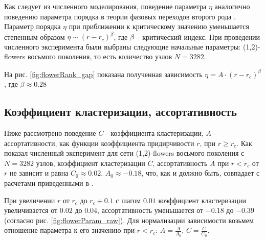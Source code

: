 \documentclass[10pt,aps,pra]{revtex4-1}
\begin{document}
        Как следует из численного моделирования, поведение параметра $\eta$ аналогично поведению параметра порядка в теории фазовых переходов второго рода \cite{Landau}. Параметр порядка $\eta$ при приближении к критическому значению уменьшается степенным образом $\eta \sim (r-r_c)^\beta$, где $\beta$ – критический индекс. 
        При проведении численного эксперимента были выбраны следующие начальные параметры: (1,2)-flowers восьмого поколения, то есть количество узлов $N=3282$.

        На рис. \ref{fig:flowerRank_gap} показана полученная зависимость $\eta = A \cdot {(r-r_c)}^\beta$, где $\beta \approx 0.28$

    \subsection{Коэффициент кластеризации, ассортативность}

        Ниже рассмотрено поведение $C$ - коэффициента кластеризации, $A$ - ассортативности, как функции коэффициента придирчивости $r$, при $r \geq r_c$. Как показал численный эксперимент для сети (1,2)-flowers восьмого поколения с $N=3282$ узлов, коэффициент кластеризации $C$, ассортативность $A$ при $r<r_c$ от $r$ не зависит и равна $C_0 \approx 0.02$, $A_0 \approx -0.18$, что, как и должно быть, совпадает с расчетами приведенными в \cite{Rozenfeld1,Rozenfeld2}. 

        При увеличении $r$ от $r_c$ до $r_c + 0.1$ с шагом $0.01$ коэффициент кластеризации увеличивается от $0.02$ до $0.04$, ассортативность уменьшается от $-0.18$ до $-0.39$ (согласно рис. \ref{fig:flowerParam_raw}). Для нормализации зависимости возьмем отношение параметра к его значению при $r<r_c$: $A=\frac{A}{A_0}$, $C=\frac{C}{C_0}$.
\end{document}
